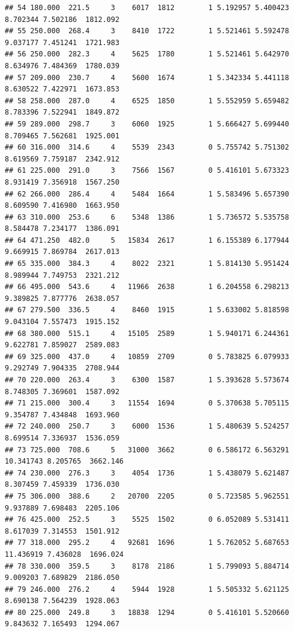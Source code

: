 \documentclass[
]{book}
\theoremstyle{definition}
\theoremstyle{definition}
\theoremstyle{definition}
\theoremstyle{definition}
\theoremstyle{remark}
\begin{document}
\begin{verbatim}
## 54 180.000  221.5     3    6017  1812        1 5.192957 5.400423  8.702344 7.502186  1812.092
## 55 250.000  268.4     3    8410  1722        1 5.521461 5.592478  9.037177 7.451241  1721.983
## 56 250.000  282.3     4    5625  1780        1 5.521461 5.642970  8.634976 7.484369  1780.039
## 57 209.000  230.7     4    5600  1674        1 5.342334 5.441118  8.630522 7.422971  1673.853
## 58 258.000  287.0     4    6525  1850        1 5.552959 5.659482  8.783396 7.522941  1849.872
## 59 289.000  298.7     3    6060  1925        1 5.666427 5.699440  8.709465 7.562681  1925.001
## 60 316.000  314.6     4    5539  2343        0 5.755742 5.751302  8.619569 7.759187  2342.912
## 61 225.000  291.0     3    7566  1567        0 5.416101 5.673323  8.931419 7.356918  1567.250
## 62 266.000  286.4     4    5484  1664        1 5.583496 5.657390  8.609590 7.416980  1663.950
## 63 310.000  253.6     6    5348  1386        1 5.736572 5.535758  8.584478 7.234177  1386.091
## 64 471.250  482.0     5   15834  2617        1 6.155389 6.177944  9.669915 7.869784  2617.013
## 65 335.000  384.3     4    8022  2321        1 5.814130 5.951424  8.989944 7.749753  2321.212
## 66 495.000  543.6     4   11966  2638        1 6.204558 6.298213  9.389825 7.877776  2638.057
## 67 279.500  336.5     4    8460  1915        1 5.633002 5.818598  9.043104 7.557473  1915.152
## 68 380.000  515.1     4   15105  2589        1 5.940171 6.244361  9.622781 7.859027  2589.083
## 69 325.000  437.0     4   10859  2709        0 5.783825 6.079933  9.292749 7.904335  2708.944
## 70 220.000  263.4     3    6300  1587        1 5.393628 5.573674  8.748305 7.369601  1587.092
## 71 215.000  300.4     3   11554  1694        0 5.370638 5.705115  9.354787 7.434848  1693.960
## 72 240.000  250.7     3    6000  1536        1 5.480639 5.524257  8.699514 7.336937  1536.059
## 73 725.000  708.6     5   31000  3662        0 6.586172 6.563291 10.341743 8.205765  3662.146
## 74 230.000  276.3     3    4054  1736        1 5.438079 5.621487  8.307459 7.459339  1736.030
## 75 306.000  388.6     2   20700  2205        0 5.723585 5.962551  9.937889 7.698483  2205.106
## 76 425.000  252.5     3    5525  1502        0 6.052089 5.531411  8.617039 7.314553  1501.912
## 77 318.000  295.2     4   92681  1696        1 5.762052 5.687653 11.436919 7.436028  1696.024
## 78 330.000  359.5     3    8178  2186        1 5.799093 5.884714  9.009203 7.689829  2186.050
## 79 246.000  276.2     4    5944  1928        1 5.505332 5.621125  8.690138 7.564239  1928.063
## 80 225.000  249.8     3   18838  1294        0 5.416101 5.520660  9.843632 7.165493  1294.067

\end{verbatim}
\end{document}
